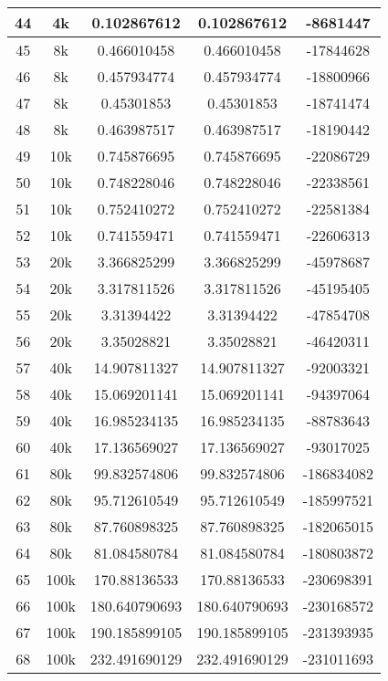 \begin{center}
\begin{longtable}{|c|c|c|c|c|}
		44 & 4k & 0.102867612 & 0.102867612 & -8681447\\
		\hline
		45 & 8k & 0.466010458 & 0.466010458 & -17844628\\
		46 & 8k & 0.457934774 & 0.457934774 & -18800966\\
		47 & 8k & 0.45301853 & 0.45301853 & -18741474\\
		48 & 8k & 0.463987517 & 0.463987517 & -18190442\\
		\hline
		49 & 10k & 0.745876695 & 0.745876695 & -22086729\\
		50 & 10k & 0.748228046 & 0.748228046 & -22338561\\
		51 & 10k & 0.752410272 & 0.752410272 & -22581384\\
		52 & 10k & 0.741559471 & 0.741559471 & -22606313\\
		\hline
		53 & 20k & 3.366825299 & 3.366825299 & -45978687\\
		54 & 20k & 3.317811526 & 3.317811526 & -45195405\\
		55 & 20k & 3.31394422 & 3.31394422 & -47854708\\
		56 & 20k & 3.35028821 & 3.35028821 & -46420311\\
		\hline
		57 & 40k & 14.907811327 & 14.907811327 & -92003321\\
		58 & 40k & 15.069201141 & 15.069201141 & -94397064\\
		59 & 40k & 16.985234135 & 16.985234135 & -88783643\\
		60 & 40k & 17.136569027 & 17.136569027 & -93017025\\
		\hline
		61 & 80k & 99.832574806 & 99.832574806 & -186834082\\
		62 & 80k & 95.712610549 & 95.712610549 & -185997521\\
		63 & 80k & 87.760898325 & 87.760898325 & -182065015\\
		64 & 80k & 81.084580784 & 81.084580784 & -180803872\\
		\hline
		65 & 100k & 170.88136533 & 170.88136533 & -230698391\\
		66 & 100k & 180.640790693 & 180.640790693 & -230168572\\
		67 & 100k & 190.185899105 & 190.185899105 & -231393935\\
		68 & 100k & 232.491690129 & 232.491690129 & -231011693\\
	\end{longtable}
\end{center}


